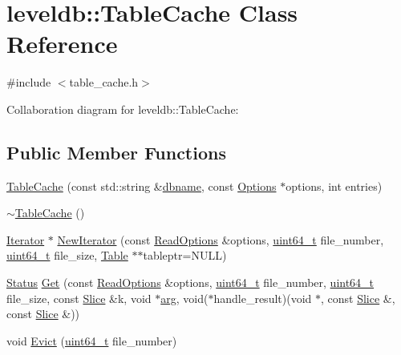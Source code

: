 \hypertarget{classleveldb_1_1_table_cache}{\section{leveldb\-:\-:Table\-Cache Class Reference}
\label{classleveldb_1_1_table_cache}
}


{\ttfamily \#include $<$table\-\_\-cache.\-h$>$}



Collaboration diagram for leveldb\-:\-:Table\-Cache\-:
\subsection*{Public Member Functions}
\begin{DoxyCompactItemize}
\item 
\hyperlink{classleveldb_1_1_table_cache_acca8df0a6305b166a7c88f27d1b3e377}{Table\-Cache} (const std\-::string \&\hyperlink{c__test_8c_a75d845559336df6843f3b599960f89d2}{dbname}, const \hyperlink{structleveldb_1_1_options}{Options} $\ast$options, int entries)
\item 
\hyperlink{classleveldb_1_1_table_cache_a5690fd10ea7cc7f0d44c8e768bea872c}{$\sim$\-Table\-Cache} ()
\item 
\hyperlink{classleveldb_1_1_iterator}{Iterator} $\ast$ \hyperlink{classleveldb_1_1_table_cache_afe8c83b1cbbf3bfc06c66a69611aa250}{New\-Iterator} (const \hyperlink{structleveldb_1_1_read_options}{Read\-Options} \&options, \hyperlink{stdint_8h_aaa5d1cd013383c889537491c3cfd9aad}{uint64\-\_\-t} file\-\_\-number, \hyperlink{stdint_8h_aaa5d1cd013383c889537491c3cfd9aad}{uint64\-\_\-t} file\-\_\-size, \hyperlink{classleveldb_1_1_table}{Table} $\ast$$\ast$tableptr=N\-U\-L\-L)
\item 
\hyperlink{classleveldb_1_1_status}{Status} \hyperlink{classleveldb_1_1_table_cache_af43ba38b52742e9f5589321747535444}{Get} (const \hyperlink{structleveldb_1_1_read_options}{Read\-Options} \&options, \hyperlink{stdint_8h_aaa5d1cd013383c889537491c3cfd9aad}{uint64\-\_\-t} file\-\_\-number, \hyperlink{stdint_8h_aaa5d1cd013383c889537491c3cfd9aad}{uint64\-\_\-t} file\-\_\-size, const \hyperlink{classleveldb_1_1_slice}{Slice} \&k, void $\ast$\hyperlink{env__posix_8cc_a9ce2ec4812a92cb6ab39f6e81e9173a9}{arg}, void($\ast$handle\-\_\-result)(void $\ast$, const \hyperlink{classleveldb_1_1_slice}{Slice} \&, const \hyperlink{classleveldb_1_1_slice}{Slice} \&))
\item 
void \hyperlink{classleveldb_1_1_table_cache_a57b81c58ff0533514b3a5d1652f044bc}{Evict} (\hyperlink{stdint_8h_aaa5d1cd013383c889537491c3cfd9aad}{uint64\-\_\-t} file\-\_\-number)
\end{DoxyCompactItemize}
